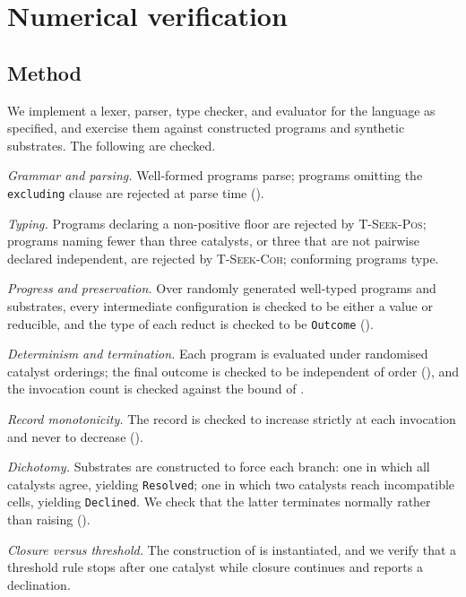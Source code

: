 \documentclass[11pt,a4paper]{article}
\theoremstyle{thmstyle}
\theoremstyle{definition}
\theoremstyle{remark}
\begin{document}
\section{Numerical verification}
\label{sec:validation}

\subsection{Method}

We implement a lexer, parser, type checker, and evaluator for the language
as specified, and exercise them against constructed programs and synthetic
substrates. The following are checked.

\emph{Grammar and parsing.} Well-formed programs parse; programs omitting
the \texttt{excluding} clause are rejected at parse time
().

\emph{Typing.} Programs declaring a non-positive floor are rejected by
\textsc{T-Seek-Pos}; programs naming fewer than three catalysts, or three
that are not pairwise declared independent, are rejected by
\textsc{T-Seek-Coh}; conforming programs type.

\emph{Progress and preservation.} Over randomly generated well-typed
programs and substrates, every intermediate configuration is checked to be
either a value or reducible, and the type of each reduct is checked to be
\texttt{Outcome} ().

\emph{Determinism and termination.} Each program is evaluated under
randomised catalyst orderings; the final outcome is checked to be
independent of order (), and the invocation count is
checked against the bound of .

\emph{Record monotonicity.} The record is checked to increase strictly at
each invocation and never to decrease ().

\emph{Dichotomy.} Substrates are constructed to force each branch: one in
which all catalysts agree, yielding \texttt{Resolved}; one in which two
catalysts reach incompatible cells, yielding \texttt{Declined}. We check
that the latter terminates normally rather than raising
().

\emph{Closure versus threshold.} The construction of
 is instantiated, and we verify that a
threshold rule stops after one catalyst while closure continues and reports
a declination.
\end{document}
